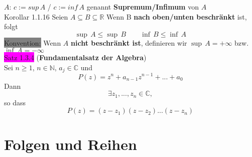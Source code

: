 \documentclass[landscape, 10pt]{article}
\newcommand{\R}{\mathbb{R}}
\newcommand{\N}{\mathbb{N}}
\newcommand{\C}{\mathbb{C}}
\begin{document}
\begin{multicols}{3}
                     \textcolor{NavyBlue}{$A$}: \quad 
                     \textcolor{NavyBlue}{$c:=sup\,A$} / 
                     \textcolor{NavyBlue}{$c:=inf\,A$}  genannt 
                     \textbf{Supremum/Infimum} von 
                     \textcolor{NavyBlue}{$A$} \\
              \colorbox{BurntOrange}{Korollar 1.1.16} 
                     Seien \textcolor{NavyBlue}{
                     $A\subseteq B\subseteq\R$} Wenn B
                     \textbf{nach oben/unten 
                     beschränkt} ist, folgt
                     \begin{equation*}
                            \sup\,A\leqslant \sup\,B \qquad
                            \inf\,B\leqslant \inf\,A
                     \end{equation*}
              \colorbox{gray}{Konvention:} 
                     Wenn $A$ \textbf{nicht beschränkt ist}, 
                     definieren wir 
                     \textcolor{NavyBlue}{$\sup\,A=+\infty$} bzw. 
                     \textcolor{NavyBlue}{$\inf\,A=-\infty$}\\
              \colorbox{magenta}{Satz 1.3.4} 
              (\textbf{Fundamentalsatz der Algebra})\\
                     Sei \textcolor{NavyBlue}{
                     $n\geqslant 1$},
                     \textcolor{NavyBlue}{$n\in\N$},
                     \textcolor{NavyBlue}{$a_j\in\C$} und 
                     \begin{equation*}
                            P(z)=z^n+a_{n-1}z^{n-1}+...+a_0
                     \end{equation*}
                     Dann 
                     \begin{equation*}
                            \exists z_1,...,z_n\in\C,
                     \end{equation*}
                     so dass
                     \begin{equation*}
                            P(z)=(z-z_1)(z-z_2)...(z-z_n)
                     \end{equation*}
\section{Folgen und Reihen}

\end{multicols}
\end{document}
